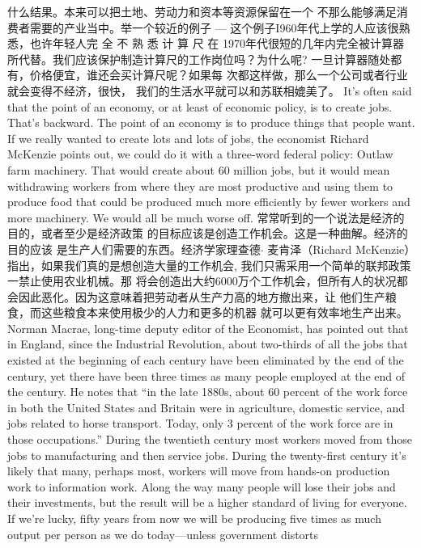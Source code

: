 \begin{paracol}{2}
什么结果。本来可以把土地、劳动力和资本等资源保留在一个
不那么能够满足消费者需要的产业当中。举一个较近的例子
--- 这个例子I960年代上学的人应该很熟悉，也许年轻人完
全 不 熟 悉 计 算 尺 在 1970年代很短的几年内完全被计算器
所代替。我们应该保护制造计算尺的工作岗位吗？为什么呢?
一旦计算器随处都有，价格便宜，谁还会买计算尺呢？如果每
次都这样做，那么一个公司或者行业就会变得不经济，很快，
我们的生活水平就可以和苏联相媲美了。
\switchcolumn*
It's often said that the point of an economy, or at least of economic policy, is to create jobs. That's backward. The point of an
economy is to produce things that people want. If we really
wanted to create lots and lots of jobs, the economist Richard
McKenzie points out, we could do it with a three-word federal
policy: Outlaw farm machinery. That would create about 60
million jobs, but it would mean withdrawing workers from
where they are most productive and using them to produce
food that could be produced much more efficiently by fewer
workers and more machinery. We would all be much worse off.
\switchcolumn
常常听到的一个说法是经济的目的，或者至少是经济政策
的目标应该是创造工作机会。这是一种曲解。经济的目的应该
是生产人们需要的东西。经济学家理查德$\cdot$ 麦肯泽（Richard McKenzie）指出，如果我们真的是想创造大量的工作机会,
我们只需采用一个简单的联邦政策一禁止使用农业机械。那
将会创造出大约6000万个工作机会，但所有人的状况都会因此恶化。因为这意味着把劳动者从生产力高的地方撤出来，让
他们生产粮食，而这些粮食本来使用极少的人力和更多的机器
就可以更有效率地生产出来。
\switchcolumn*
Norman Macrae, long-time deputy editor of the Economist,
has pointed out that in England, since the Industrial Revolution, about two-thirds of all the jobs that existed at the beginning of each century have been eliminated by the end of the
century, yet there have been three times as many people employed at the end of the century. He notes that ``in the late
1880s, about 60 percent of the work force in both the United
States and Britain were in agriculture, domestic service, and
jobs related to horse transport. Today, only 3 percent of the
work force are in those occupations.'' During the twentieth century most workers moved from those jobs to manufacturing
and then service jobs. During the twenty-first century it's likely
that many, perhaps most, workers will move from hands-on
production work to information work. Along the way many
people will lose their jobs and their investments, but the result
will be a higher standard of living for everyone. If we're lucky,
fifty years from now we will be producing five times as much
output per person as we do today---unless government distorts

\end{paracol}
